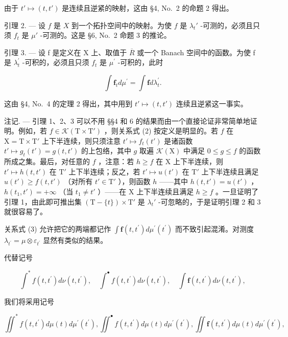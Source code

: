 由于 \(t' \mapsto (t, t')\) 是连续且逆紧的映射，这由 §4, No.~2 的命题 2 得出。

引理 2. --- 设 \(f\) 是 \(X\) 到一个拓扑空间中的映射。为使 \(f\) 是 \(\lambda_t'\) -可测的，必须且只须 \(f_t\) 是 \(\mu'\) -可测的。这是 §6, No.~2 命题 3 的推论。

引理 3. --- 设 f 是定义在 X 上、取值于 \(\overline{R}\) 或一个 Banach 空间中的函数。为使 f 是 \(\lambda_{t}^{\prime}\) -可积的，必须且只须 \(f_{t}\) 是 \(\mu^{\prime}\) -可积的，此时

\[
\int \mathbf {f} _ {t} d \mu^ {\prime} = \int \mathbf {f} d \lambda_ {t} ^ {\prime}.\tag{3}
\]

这由 §4, No.~4 的定理 2 得出，其中用到 \(t' \mapsto (t, t')\) 连续且逆紧这一事实。

注记. --- 引理 1、2、3 可以不用 §§4 和 6 的结果而由一个直接论证非常简单地证明。例如，若 \(f \in \mathcal{K}(\mathrm{T} \times \mathrm{T}')\) ，则关系式 (2) 按定义是明显的。若 \(f\) 在 \(\mathrm{X} = \mathrm{T} \times \mathrm{T}'\) 上下半连续，则只须注意 \(t' \mapsto f_t(t')\) 是诸函数 \(t' \mapsto g_t(t') = g(t, t')\) 的上包络，其中 \(g\) 取遍 \(\mathcal{K}(\mathrm{X})\) 中满足 \(0 \leqslant g \leqslant f\) 的函数所成之集。最后，对任意的 \(f\) ，注意：若 \(h \geqslant f\) 在 \(\mathrm{X}\) 上下半连续，则 \(t' \mapsto h(t, t')\) 在 \(\mathrm{T}'\) 上下半连续；反之，若 \(t' \mapsto u(t')\) 在 \(\mathrm{T}'\) 上下半连续且满足 \(u(t') \geqslant f(t, t')\) （对所有 \(t' \in \mathrm{T}'\) ），则函数 \(h\) ——其中 \(h(t, t') = u(t')\) ，\(h(t_1, t') = +\infty\) （当 \(t_1 \neq t'\) ）——在 \(\mathrm{X}\) 上下半连续且满足 \(h \geqslant f\) 。一旦证明了引理 1，由此即可推出集 \((\mathrm{T} - \{t\}) \times \mathrm{T}'\) 是 \(\lambda_t'\) -可忽略的，于是证明引理 2 和 3 就很容易了。

关系式 (3) 允许把它的两端都记作 \(\int\mathbf{f}(t,t^{\prime})d\mu^{\prime}(t^{\prime})\) 而不致引起混淆。对测度 \(\lambda_{t^{\prime}}=\mu\otimes\varepsilon_{t^{\prime}}\) 显然有类似的结果。

代替记号

\[
\int^ {*} f (t, t ^ {\prime}) d \nu (t, t ^ {\prime}), \quad \int^ {\bullet} f (t, t ^ {\prime}) d \nu (t, t ^ {\prime}), \quad \int \mathbf {f} (t, t ^ {\prime}) d \nu (t, t ^ {\prime}),
\]

我们将采用记号

\[
\iint^ {*} f (t, t ^ {\prime}) d \mu (t) d \mu^ {\prime} (t ^ {\prime}), \iint^ {\bullet} f (t, t ^ {\prime}) d \mu (t) d \mu^ {\prime} (t ^ {\prime}), \iint \mathbf {f} (t, t ^ {\prime}) d \mu (t) d \mu^ {\prime} (t ^ {\prime}),
\]


